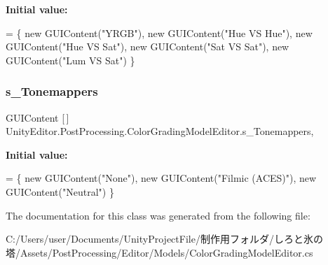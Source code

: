 {\bfseries Initial value\+:}
\begin{DoxyCode}
=
        \{
            \textcolor{keyword}{new} GUIContent(\textcolor{stringliteral}{"YRGB"}),
            \textcolor{keyword}{new} GUIContent(\textcolor{stringliteral}{"Hue VS Hue"}),
            \textcolor{keyword}{new} GUIContent(\textcolor{stringliteral}{"Hue VS Sat"}),
            \textcolor{keyword}{new} GUIContent(\textcolor{stringliteral}{"Sat VS Sat"}),
            \textcolor{keyword}{new} GUIContent(\textcolor{stringliteral}{"Lum VS Sat"})
        \}
\end{DoxyCode}
\mbox{\label{class_unity_editor_1_1_post_processing_1_1_color_grading_model_editor_ab0c132fcde3b3c384cfa4210ac3bc558}} 
\subsubsection{\texorpdfstring{s\+\_\+\+Tonemappers}{s\_Tonemappers}}
{\footnotesize\ttfamily G\+U\+I\+Content \mbox{[}$\,$\mbox{]} Unity\+Editor.\+Post\+Processing.\+Color\+Grading\+Model\+Editor.\+s\+\_\+\+Tonemappers\hspace{0.3cm}{\ttfamily [static]}, {\ttfamily [private]}}

{\bfseries Initial value\+:}
\begin{DoxyCode}
=
        \{
            \textcolor{keyword}{new} GUIContent(\textcolor{stringliteral}{"None"}),
            \textcolor{keyword}{new} GUIContent(\textcolor{stringliteral}{"Filmic (ACES)"}),
            \textcolor{keyword}{new} GUIContent(\textcolor{stringliteral}{"Neutral"})
        \}
\end{DoxyCode}


The documentation for this class was generated from the following file\+:\begin{DoxyCompactItemize}
\item 
C\+:/\+Users/user/\+Documents/\+Unity\+Project\+File/制作用フォルダ/しろと氷の塔/\+Assets/\+Post\+Processing/\+Editor/\+Models/Color\+Grading\+Model\+Editor.\+cs\end{DoxyCompactItemize}
